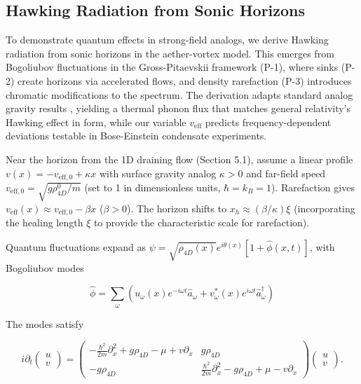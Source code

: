 \documentclass{article}
\begin{document}
\subsection{Hawking Radiation from Sonic Horizons}

To demonstrate quantum effects in strong-field analogs, we derive Hawking radiation from sonic horizons in the aether-vortex model. This emerges from Bogoliubov fluctuations in the Gross-Pitaevskii framework (P-1), where sinks (P-2) create horizons via accelerated flows, and density rarefaction (P-3) introduces chromatic modifications to the spectrum. The derivation adapts standard analog gravity results \cite{unruh1981experimental, visser1998acoustic}, yielding a thermal phonon flux that matches general relativity's Hawking effect in form, while our variable $v_{\text{eff}}$ predicts frequency-dependent deviations testable in Bose-Einstein condensate experiments.

Near the horizon from the 1D draining flow (Section 5.1), assume a linear profile $v(x) = -v_{\text{eff},0} + \kappa x$ with surface gravity analog $\kappa > 0$ and far-field speed $v_{\text{eff},0} = \sqrt{g \rho_{4D}^0 / m}$ (set to 1 in dimensionless units, $\hbar = k_B = 1$). Rarefaction gives $v_{\text{eff}}(x) \approx v_{\text{eff},0} - \beta x$ ($\beta > 0$). The horizon shifts to $x_h \approx (\beta / \kappa) \xi$ (incorporating the healing length $\xi$ to provide the characteristic scale for rarefaction).

Quantum fluctuations expand as $\psi = \sqrt{\rho_{4D}(x)} e^{i \theta(x)} [1 + \hat{\phi}(x,t)]$, with Bogoliubov modes

\[
\hat{\phi} = \sum_\omega (u_\omega(x) e^{-i\omega t} \hat{a}_\omega + v_\omega^*(x) e^{i\omega t} \hat{a}_\omega^\dagger)
\]

The modes satisfy

\[
i \partial_t \begin{pmatrix} u \\ v \end{pmatrix} = \begin{pmatrix} -\frac{\hbar^2}{2m} \partial_x^2 + g \rho_{4D} - \mu + v \partial_x & g \rho_{4D} \\ -g \rho_{4D} & \frac{\hbar^2}{2m} \partial_x^2 - g \rho_{4D} + \mu - v \partial_x \end{pmatrix} \begin{pmatrix} u \\ v \end{pmatrix}.
\]
\end{document}
